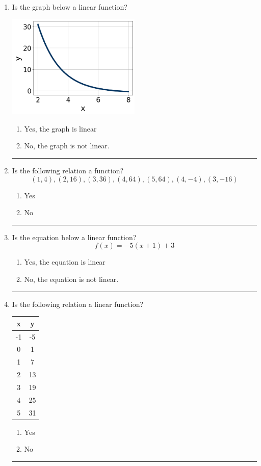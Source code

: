 \documentclass[14pt]{extbook}
\newcommand{\litem}[1]{\item#1\hspace*{-1cm}\rule{\textwidth}{0.4pt}}
\begin{document}
\begin{enumerate}
{\begin{enumerate}[label=\Alph*.]
\end{enumerate} }
\litem{
Is the graph below a linear function?
\begin{center}
    \includegraphics[width=0.5\textwidth]{../Figures/MA_8_F_1_2_graphR.png}
\end{center}
\begin{enumerate}[label=\Alph*.]
\item Yes, the graph is linear
\item No, the graph is not linear.

\end{enumerate} }
\litem{
Is the following relation a function?\[ (1, 4), (2, 16), (3, 36), (4, 64), (5, 64), (4, -4), (3, -16) \]\begin{enumerate}[label=\Alph*.]
\item Yes
\item No

\end{enumerate} }
\litem{
Is the equation below a linear function?\[ f(x) = -5(x + 1)+3 \]\begin{enumerate}[label=\Alph*.]
\item Yes, the equation is linear
\item No, the equation is not linear.

\end{enumerate} }
\litem{
Is the following relation a linear function?

\begin{tabular}{c|c}
x &y\tabularnewline \hline
-1 &-5\tabularnewline \hline
0 &1\tabularnewline \hline
1 &7\tabularnewline \hline
2 &13\tabularnewline \hline
3 &19\tabularnewline \hline
4 &25\tabularnewline \hline
5 &31\end{tabular}\begin{enumerate}[label=\Alph*.]
\item Yes
\item No


\end{enumerate}}
\end{enumerate}
\end{document}
